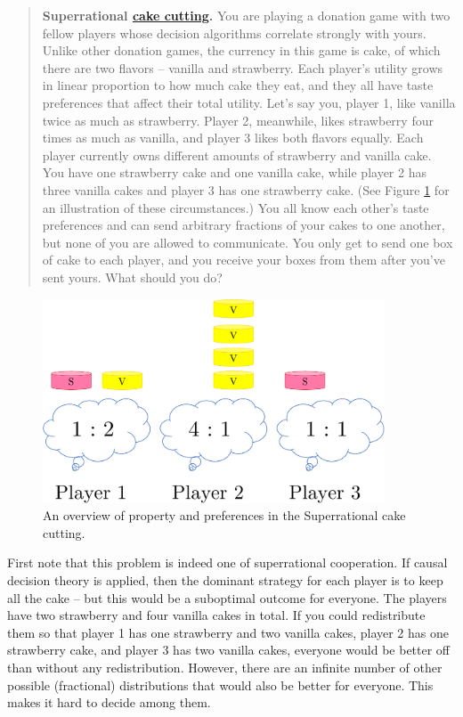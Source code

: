 \begin{quote}
\textbf{Superrational
\href{https://en.wikipedia.org/wiki/Fair_cake-cutting}{cake
cutting}.} You are playing a donation game with two fellow players
whose decision algorithms correlate strongly with yours. Unlike other
donation games, the currency in this game is cake, of which there are
two flavors -- vanilla and strawberry. Each player's utility grows in
linear proportion to how much cake they eat, and they all have taste
preferences that affect their total utility. Let's say you, player 1,
like vanilla twice as much as strawberry. Player 2, meanwhile, likes
strawberry four times as much as vanilla, and player 3 likes both
flavors equally. Each player currently owns different amounts of
strawberry and vanilla cake. You have one strawberry cake and one
vanilla cake, while player 2 has three vanilla cakes and player 3 has
one strawberry cake. (See Figure
\ref{Superrational-cake-cutting} for an illustration of
these circumstances.) You all know each other's taste preferences and
can send arbitrary fractions of your cakes to one another, but none of
you are allowed to communicate. You only get to send one box of cake to
each player, and you receive your boxes from them after you've sent
yours. What should you do?
\end{quote}

\begin{figure}[h!]
    \centering
    \includegraphics[width=4in]{figs/Superrational-cake-cutting}
    \caption{An overview of property and preferences in the Superrational cake cutting.}
    \label{Superrational-cake-cutting}
\end{figure}

First note that this problem is indeed one of superrational cooperation.
If causal decision theory is applied, then the dominant strategy for
each player is to keep all the cake -- but this would be a suboptimal
outcome for everyone. The players have two strawberry and four vanilla
cakes in total. If you could redistribute them so that player 1 has one
strawberry and two vanilla cakes, player 2 has one strawberry cake, and
player 3 has two vanilla cakes, everyone would be better off than
without any redistribution. However, there are an infinite number of
other possible (fractional) distributions that would also be better for
everyone. This makes it hard to decide among them.


